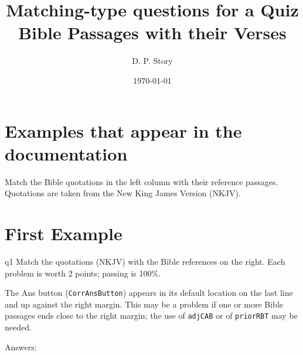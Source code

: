 \documentclass[11pt]{article}
\title{Matching-type questions for a Quiz\texorpdfstring{\\[1ex]}{: }Bible Passages with their Verses}
\author{D. P. Story}
\date{\today}
\def\cs#1{\texttt{\eqbs#1}}
\begin{document}
\maketitle

\section*{Examples that appear in the documentation}

Match the Bible quotations in the left column with their reference passages.
Quotations are taken from the \textsf{New King James Version (NKJV)}.

\section*{First Example}

\begin{quiz}{q1}
Match the quotations (\textsf{NKJV)} with the Bible references on the right.
Each problem is worth 2 points; passing is 100\%.

The \textsf{Ans} button (\cs{CorrAnsButton}) appears in its default location
on the last line and up against the right margin. This may be a problem if
one or more Bible passages ends close to the right margin; the use of
\cs{adjCAB} or of \cs{priorRBT} may be needed.


\noindent
\begin{minipage}[t]{.75\linewidth}
\begin{questions}
\begin{BblPsg}
  \item{}
  \item{}
  \item{}
\end{BblPsg}
\end{questions}
\end{minipage}
\hfill
\begin{minipage}[t][0pt]{.25\linewidth-1em}
\begin{questions}[itemsep={0pt},labelwidth={.5em}]
\begin{BblVrs}
  \item{}
  \item{}
  \item{}
  \item{}
  \item{}
  \item{}
\end{BblVrs}
\end{questions}
\end{minipage}\hfill
\par\medskip
\end{quiz}\quad\PointsField\currQuiz\olBdry\CorrButton\currQuiz\cgBdry[6pt]
Answers: 
\end{document}
